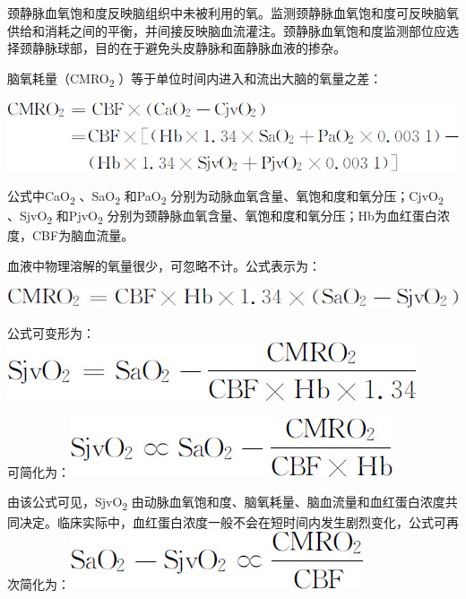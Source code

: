 颈静脉血氧饱和度反映脑组织中未被利用的氧。监测颈静脉血氧饱和度可反映脑氧供给和消耗之间的平衡，并间接反映脑血流灌注。颈静脉血氧饱和度监测部位应选择颈静脉球部，目的在于避免头皮静脉和面静脉血液的掺杂。

脑氧耗量（CMRO\textsubscript{2}
）等于单位时间内进入和流出大脑的氧量之差：

\begin{center}
\includegraphics{./images/Image00266.jpg}
\end{center}

公式中CaO\textsubscript{2} 、SaO\textsubscript{2} 和PaO\textsubscript{2}
分别为动脉血氧含量、氧饱和度和氧分压；CjvO\textsubscript{2}
、SjvO\textsubscript{2} 和PjvO\textsubscript{2}
分别为颈静脉血氧含量、氧饱和度和氧分压；Hb为血红蛋白浓度，CBF为脑血流量。

血液中物理溶解的氧量很少，可忽略不计。公式表示为：

\begin{center}
\includegraphics{./images/Image00267.jpg}
\end{center}

公式可变形为：\includegraphics{./images/Image00268.jpg}

可简化为：\includegraphics{./images/Image00269.jpg}

由该公式可见，SjvO\textsubscript{2}
由动脉血氧饱和度、脑氧耗量、脑血流量和血红蛋白浓度共同决定。临床实际中，血红蛋白浓度一般不会在短时间内发生剧烈变化，公式可再次简化为：\includegraphics{./images/Image00270.jpg}

